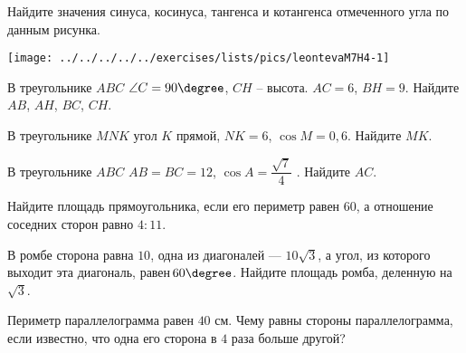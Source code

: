 \begin{homework}[number=4]
	\begin{listofex}
		\item  
		\begin{minipage}[t]{\bodywidth}
			Найдите значения синуса, косинуса, тангенса и котангенса отмеченного угла по данным рисунка.
		\end{minipage}
		\hspace{0.02\linewidth}
		\begin{minipage}[t]{\picwidth}
			\texttt{[image: ../../../../../exercises/lists/pics/leontevaM7H4-1]}
		\end{minipage} 
		\item В треугольнике \( ABC \) \( \angle C = 90\degree \), \( CH \) – высота. \( AC = 6 \), \( BH = 9 \). Найдите \( AB \), \( AH \), \( BC \), \( CH \).
		\item В треугольнике \( MNK \) угол \( K \) прямой,
		\( NK=6 \), \( \cos M=0,6 \). Найдите \( MK \).
		\item  В треугольнике \( ABC \) \(AB = BC = 12 \), \( \cos A = \dfrac{\sqrt{7}}{4} \) . Найдите \(AC \).
		\item Найдите площадь прямоугольника, если его периметр равен \( 60 \), а отношение соседних сторон равно \( 4:11 \).
		\item В ромбе сторона равна \( 10 \), одна из диагоналей  — \( 10\sqrt{3} \), а угол, из которого выходит эта диагональ, равен \( 60\degree \). Найдите площадь ромба, деленную на  \( \sqrt{3} \).
		\item Периметр параллелограмма равен \( 40 \) см. Чему равны стороны параллелограмма, если известно, что одна его сторона в \( 4 \) раза больше другой?
		
	\end{listofex}
\end{homework}
